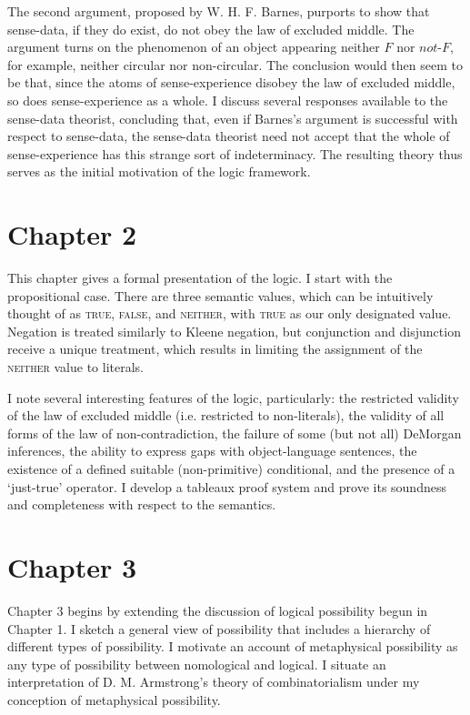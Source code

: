\documentclass[12pt]{article}
\begin{document}
The second argument, proposed by W. H. F. Barnes, purports to show that sense-data, if they do exist, do not obey the law of excluded middle. The argument turns on the phenomenon of an object appearing neither $F$ nor $not$-$F$, for example, neither circular nor non-circular. The conclusion would then seem to be that, since the atoms of sense-experience disobey the law of excluded middle, so does sense-experience as a whole. I discuss several responses available to the sense-data theorist, concluding that, even if Barnes's argument is successful with respect to sense-data, the sense-data theorist need not accept that the whole of sense-experience has this strange sort of indeterminacy. The resulting theory thus serves as the initial motivation of the logic framework.
\section*{Chapter 2}
This chapter gives a formal presentation of the logic. I start with the propositional case. There are three semantic values, which can be intuitively thought of as \textsc{true}, \textsc{false}, and \textsc{neither}, with \textsc{true} as our only designated value. Negation is treated similarly to Kleene negation, but conjunction and disjunction receive a unique treatment, which results in limiting the assignment of the \textsc{neither} value to literals.

I note several interesting features of the logic, particularly: the restricted validity of the law of excluded middle (i.e. restricted to non-literals), the validity of all forms of the law of non-contradiction, the failure of some (but not all) DeMorgan inferences, the ability to express gaps with object-language sentences, the existence of a defined suitable (non-primitive) conditional, and the presence of a `just-true' operator.  I develop a tableaux proof system and prove its soundness and completeness with respect to the semantics.
\section*{Chapter 3}
Chapter 3 begins by extending the discussion of logical possibility begun in Chapter 1. I sketch a general view of possibility that includes a hierarchy of different types of possibility. I motivate an account of metaphysical possibility as any type of possibility between nomological and logical. I situate an interpretation of D. M. Armstrong's theory of combinatorialism under my conception of metaphysical possibility. 
\end{document}
